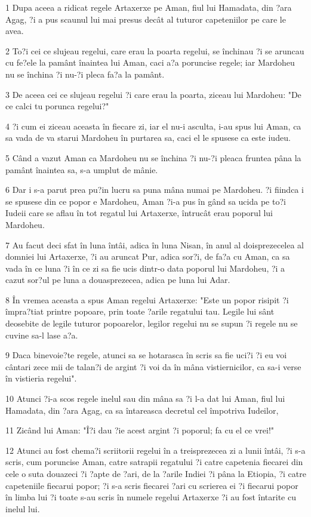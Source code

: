 \par 1 Dupa aceea a ridicat regele Artaxerxe pe Aman, fiul lui Hamadata, din ?ara Agag, ?i a pus scaunul lui mai presus decât al tuturor capeteniilor pe care le avea.
\par 2 To?i cei ce slujeau regelui, care erau la poarta regelui, se închinau ?i se aruncau cu fe?ele la pamânt înaintea lui Aman, caci a?a poruncise regele; iar Mardoheu nu se închina ?i nu-?i pleca fa?a la pamânt.
\par 3 De aceea cei ce slujeau regelui ?i care erau la poarta, ziceau lui Mardoheu: "De ce calci tu porunca regelui?"
\par 4 ?i cum ei ziceau aceasta în fiecare zi, iar el nu-i asculta, i-au spus lui Aman, ca sa vada de va starui Mardoheu în purtarea sa, caci el le spusese ca este iudeu.
\par 5 Când a vazut Aman ca Mardoheu nu se închina ?i nu-?i pleaca fruntea pâna la pamânt înaintea sa, s-a umplut de mânie.
\par 6 Dar i s-a parut prea pu?in lucru sa puna mâna numai pe Mardoheu. ?i fiindca i se spusese din ce popor e Mardoheu, Aman ?i-a pus în gând sa ucida pe to?i Iudeii care se aflau în tot regatul lui Artaxerxe, întrucât erau poporul lui Mardoheu.
\par 7 Au facut deci sfat în luna întâi, adica în luna Nisan, în anul al doisprezecelea al domniei lui Artaxerxe, ?i au aruncat Pur, adica sor?i, de fa?a cu Aman, ca sa vada în ce luna ?i în ce zi sa fie ucis dintr-o data poporul lui Mardoheu, ?i a cazut sor?ul pe luna a douasprezecea, adica pe luna lui Adar.
\par 8 În vremea aceasta a spus Aman regelui Artaxerxe: "Este un popor risipit ?i împra?tiat printre popoare, prin toate ?arile regatului tau. Legile lui sânt deosebite de legile tuturor popoarelor, legilor regelui nu se supun ?i regele nu se cuvine sa-l lase a?a.
\par 9 Daca binevoie?te regele, atunci sa se hotarasca în scris sa fie uci?i ?i eu voi cântari zece mii de talan?i de argint ?i voi da în mâna vistiernicilor, ca sa-i verse în vistieria regelui".
\par 10 Atunci ?i-a scos regele inelul sau din mâna sa ?i l-a dat lui Aman, fiul lui Hamadata, din ?ara Agag, ca sa întareasca decretul cel împotriva Iudeilor,
\par 11 Zicând lui Aman: "Î?i dau ?ie acest argint ?i poporul; fa cu el ce vrei!"
\par 12 Atunci au fost chema?i scriitorii regelui în a treisprezecea zi a lunii întâi, ?i s-a scris, cum poruncise Aman, catre satrapii regatului ?i catre capetenia fiecarei din cele o suta douazeci ?i ?apte de ?ari, de la ?arile Indiei ?i pâna la Etiopia, ?i catre capeteniile fiecarui popor; ?i s-a scris fiecarei ?ari cu scrierea ei ?i fiecarui popor în limba lui ?i toate s-au scris în numele regelui Artaxerxe ?i au fost întarite cu inelul lui.
